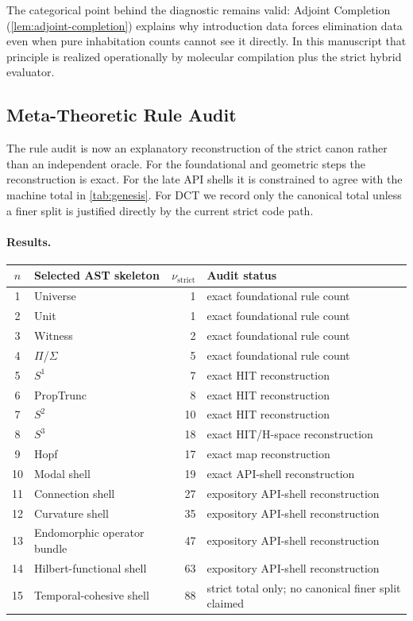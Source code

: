 \documentclass[11pt,a4paper]{article}
\theoremstyle{plain}
\theoremstyle{definition}
\theoremstyle{remark}
\begin{document}
The categorical point behind the diagnostic remains valid:
Adjoint Completion (\cref{lem:adjoint-completion}) explains why introduction data forces elimination data even when pure inhabitation counts cannot see it directly.
In this manuscript that principle is realized operationally by molecular compilation plus the strict hybrid evaluator.

\subsection{Meta-Theoretic Rule Audit}
\label{sec:inference-nu}

The rule audit is now an explanatory reconstruction of the strict canon rather than an independent oracle.
For the foundational and geometric steps the reconstruction is exact.
For the late API shells it is constrained to agree with the machine total in \cref{tab:genesis}.
For DCT we record only the canonical total unless a finer split is justified directly by the current strict code path.

\paragraph{Results.}
\begin{center}
\small
\begin{tabular}{@{}cl rl@{}}
\toprule
$n$ & Selected AST skeleton & $\nu_{\mathrm{strict}}$ & Audit status \\
\midrule
1  & Universe         & 1  & exact foundational rule count \\
2  & Unit             & 1  & exact foundational rule count \\
3  & Witness          & 2  & exact foundational rule count \\
4  & $\Pi$/$\Sigma$   & 5  & exact foundational rule count \\
5  & $S^1$            & 7  & exact HIT reconstruction \\
6  & PropTrunc        & 8  & exact HIT reconstruction \\
7  & $S^2$            & 10 & exact HIT reconstruction \\
8  & $S^3$            & 18 & exact HIT/H-space reconstruction \\
9  & Hopf             & 17 & exact map reconstruction \\
10 & Modal shell      & 19 & exact API-shell reconstruction \\
11 & Connection shell & 27 & expository API-shell reconstruction \\
12 & Curvature shell  & 35 & expository API-shell reconstruction \\
13 & Endomorphic operator bundle & 47 & expository API-shell reconstruction \\
14 & Hilbert-functional shell & 63 & expository API-shell reconstruction \\
15 & Temporal-cohesive shell & 88 & strict total only; no canonical finer split claimed \\
\bottomrule
\end{tabular}
\end{center}
\end{document}
